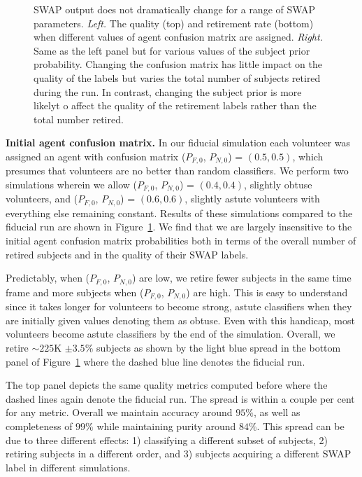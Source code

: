\documentclass[twocolumn]{aastex6}
\newcommand{\Pf}{$P_{F,0}$}
\newcommand{\Pn}{$P_{N,0}$}
\begin{document}
\begin{figure}[t]
\caption{SWAP output does not dramatically change for a range of SWAP parameters.  \textit{Left.} The quality (top) and retirement rate (bottom) when different values of agent confusion matrix are assigned. \textit{Right.} Same as the left panel but for various values of the subject prior probability. Changing the confusion matrix has little impact on the quality of the labels but varies the total number of subjects retired during the run. In contrast, changing the subject prior is more likelyt o affect the quality of the retirement labels rather than the total number retired. \label{fig: tweak swap}}
\end{figure}

\textbf{Initial agent confusion matrix.} 
In our fiducial simulation each volunteer was assigned an agent with confusion matrix
 (\Pf, \Pn) = $(0.5, 0.5)$, which presumes that volunteers are no better than 
random classifiers.  We perform two simulations wherein we allow (\Pf, \Pn) = $(0.4, 0.4)$, 
slightly obtuse volunteers, and (\Pf, \Pn) = $(0.6, 0.6)$, slightly astute volunteers 
with everything else remaining constant.  
Results of these simulations compared to the fiducial run are shown in 
Figure~\ref{fig: tweak swap}. We find that we are largely insensitive to the 
initial agent confusion matrix probabilities both in terms of the overall number of retired subjects
and in the quality of their SWAP labels. 

Predictably, when (\Pf, \Pn) are low, we retire fewer subjects in the same time frame and 
more subjects when (\Pf, \Pn) are high. This is easy to understand since it takes 
longer for volunteers to become strong, astute classifiers when they are initially 
given values denoting them as obtuse. Even with this handicap, most volunteers 
become astute classifiers by the end of the simulation. Overall,  we retire 
$\sim225$K  $\pm 3.5\%$ subjects as shown by the light blue spread in the bottom
panel of Figure~\ref{fig: tweak swap} where the dashed blue line
denotes the fiducial run. 

The top panel depicts the same quality metrics computed before where the dashed 
lines again denote the fiducial run.  The spread is within a couple per cent for any
metric. Overall we maintain accuracy around $95\%$, as well as completeness of $99\%$
while maintaining purity around $84\%$. This spread can be due to three different
effects: 1) classifying a different subset of subjects, 2) retiring subjects in a different
order, and 3) subjects acquiring a different SWAP label in different simulations. 
\end{document}
